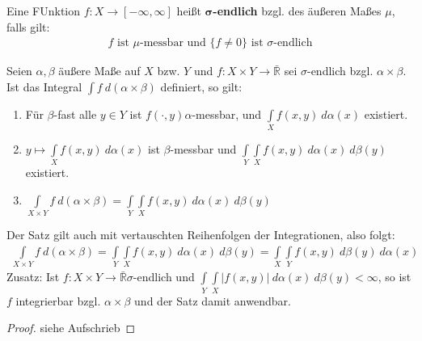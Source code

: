   \begin{definition}
    Eine FUnktion $f: X \to [-\infty, \infty]$ heißt $\bm{\sigma}$\textbf{-endlich} bzgl. des äußeren Maßes $\mu$, falls gilt:
    \begin{align*}
      f \text{ ist } \mu \text{-messbar und } \{f \neq 0\} \text{ ist } \sigma \text{-endlich}
    \end{align*}
  \end{definition}

  \begin{theorem}[Fubini]
    Seien $\alpha, \beta$ äußere Maße auf $X$ bzw. $Y$ und $f: X \times Y \to \bar{\mathbb{R}}$ sei $\sigma$-endlich bzgl. $\alpha \times \beta$. Ist das Integral $\int f \ d(\alpha \times \beta)$ definiert, so gilt:
    \begin{enumerate}
      \item Für $\beta$-fast alle $y \in Y$ ist $f(\cdot, y) \alpha$-messbar, und $\int\limits_X f(x,y) \ d \alpha(x)$ existiert.
      \item $y \mapsto \int\limits_X f(x,y) \ d\alpha(x)$ ist $\beta$-messbar und $\int\limits_Y \int\limits_X f(x,y) \ d\alpha(x) \ d\beta(y)$ existiert.
      \item $\int\limits_{X\times Y} f \ d(\alpha \times \beta) = \int\limits_Y \int\limits_X f(x,y) \ d\alpha(x) \ d\beta(y)$
    \end{enumerate}
    Der Satz gilt auch mit vertauschten Reihenfolgen der Integrationen, also folgt:
    \begin{align*}
      \int\limits_{X\times Y} f \ d(\alpha \times \beta) = \int\limits_Y \int\limits_X f(x,y) \ d\alpha(x) \ d\beta(y) = \int\limits_X \int\limits_Y f(x,y) \ d\beta(y) \ d\alpha(x)
    \end{align*}
    Zusatz: Ist $f: X \times Y \to \bar{\mathbb{R}} \sigma$-endlich und $\int\limits_Y \int\limits_X |f(x,y)| \ d\alpha(x) \ d\beta(y) < \infty$, so ist $f$ integrierbar bzgl. $\alpha \times \beta$ und der Satz damit anwendbar.
  \end{theorem}

  \begin{proof}
    siehe Aufschrieb
  \end{proof}

